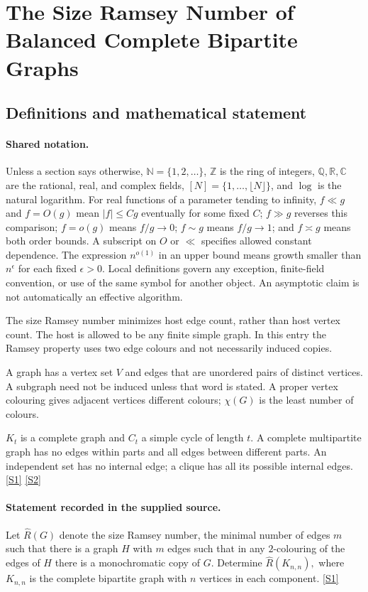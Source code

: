 \documentclass[11pt,a4paper]{article}
\newcommand{\N}{\mathbb{N}}
\newcommand{\Z}{\mathbb{Z}}
\newcommand{\Q}{\mathbb{Q}}
\newcommand{\R}{\mathbb{R}}
\newcommand{\C}{\mathbb{C}}
\newcommand{\sref}[2]{\hyperlink{source:#1:#2}{[S#2]}}
\begin{document}
\section{The Size Ramsey Number of Balanced Complete Bipartite Graphs}\label{statement}


\subsection{Definitions and mathematical statement}

\paragraph{Shared notation.}Unless a section says otherwise, $\N=\{1,2,\ldots\}$,
$\Z$ is the ring of integers, $\Q,\R,\C$ are the rational, real, and complex
fields, $[N]=\{1,\ldots,\lfloor N\rfloor\}$, and $\log$ is the natural
logarithm. For real functions of a parameter tending to infinity,
$f\ll g$ and $f=O(g)$ mean $|f|\leq Cg$ eventually for some fixed $C$;
$f\gg g$ reverses this comparison; $f=o(g)$ means $f/g\to0$;
$f\sim g$ means $f/g\to1$; and $f\asymp g$ means both order bounds.
A subscript on $O$ or $\ll$ specifies allowed constant dependence.
The expression $n^{o(1)}$ in an upper bound means growth smaller than
$n^\epsilon$ for each fixed $\epsilon>0$. Local definitions govern any
exception, finite-field convention, or use of the same symbol for another
object. An asymptotic claim is not automatically an effective algorithm.



The size Ramsey number minimizes host edge count, rather than host vertex count. The host is allowed to be any finite simple graph. In this entry the Ramsey property uses two edge colours and not necessarily induced copies.

A graph has a vertex set $V$ and edges that are unordered pairs of distinct vertices. A subgraph need not be induced unless that word is stated. A proper vertex colouring gives adjacent vertices different colours; $\chi(G)$ is the least number of colours.

$K_t$ is a complete graph and $C_t$ a simple cycle of length $t$. A complete multipartite graph has no edges within parts and all edges between different parts. An independent set has no internal edge; a clique has all its possible internal edges. \sref{statement}{1} \sref{statement}{2}

\paragraph{Statement recorded in the supplied source.}
Let $\hat{R}(G)$ denote the size Ramsey number, the minimal number of edges $m$ such that there is a graph $H$ with $m$ edges such that in any $2$-colouring of the edges of $H$ there is a monochromatic copy of $G$.
Determine $ \hat{R}(K_{n,n}), $ where $K_{n,n}$ is the complete bipartite graph with $n$ vertices in each component. \sref{statement}{1}
\end{document}
